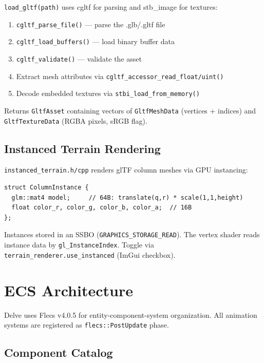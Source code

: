 \documentclass[11pt,a4paper]{article}
\begin{document}
\texttt{load\_gltf(path)} uses cgltf for parsing and stb\_image for textures:

\begin{enumerate}
  \item \texttt{cgltf\_parse\_file()} --- parse the .glb/.gltf file
  \item \texttt{cgltf\_load\_buffers()} --- load binary buffer data
  \item \texttt{cgltf\_validate()} --- validate the asset
  \item Extract mesh attributes via \texttt{cgltf\_accessor\_read\_float/uint()}
  \item Decode embedded textures via \texttt{stbi\_load\_from\_memory()}
\end{enumerate}

Returns \texttt{GltfAsset} containing vectors of \texttt{GltfMeshData} (vertices + indices) and \texttt{GltfTextureData} (RGBA pixels, sRGB flag).

\subsection{Instanced Terrain Rendering}

\texttt{instanced\_terrain.h/cpp} renders glTF column meshes via GPU instancing:

\begin{lstlisting}[caption={ColumnInstance layout (80 bytes)}]
struct ColumnInstance {
  glm::mat4 model;     // 64B: translate(q,r) * scale(1,1,height)
  float color_r, color_g, color_b, color_a;  // 16B
};
\end{lstlisting}

Instances stored in an SSBO (\texttt{GRAPHICS\_STORAGE\_READ}). The vertex shader reads instance data by \texttt{gl\_InstanceIndex}. Toggle via \texttt{terrain\_renderer.use\_instanced} (ImGui checkbox).

\section{ECS Architecture}
\label{sec:ecs}

Delve uses Flecs v4.0.5 for entity-component-system organization. All animation systems are registered as \texttt{flecs::PostUpdate} phase.

\subsection{Component Catalog}
\end{document}
